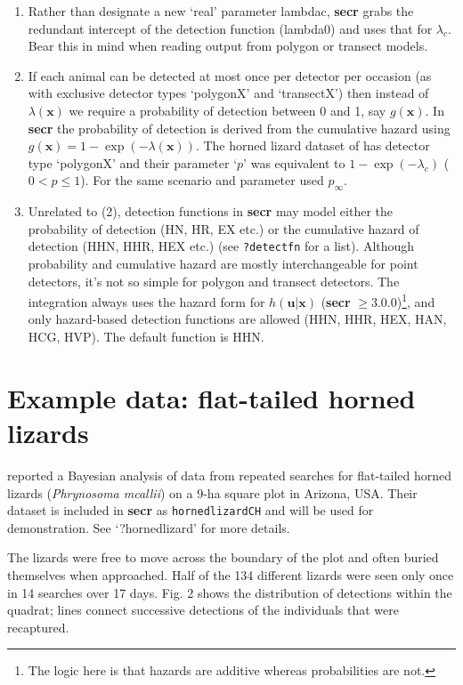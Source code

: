 \documentclass[
]{book}
\begin{document}
\begin{enumerate}
\def\labelenumi{\arabic{enumi}.}
\item
  Rather than designate a new `real' parameter lambdac, \textbf{secr} grabs the redundant intercept of the detection function (lambda0) and uses that for \(\lambda_c\). Bear this in mind when reading output from polygon or transect models.
\item
  If each animal can be detected at most once per detector per occasion (as with exclusive detector types `polygonX' and `transectX') then instead of \(\lambda(\mathbf{x})\) we require a probability of detection between 0 and 1, say \(g(\mathbf{x})\). In \textbf{secr} the probability of detection is derived from the cumulative hazard using \(g(\mathbf{x}) = 1-\exp(-\lambda(\mathbf{x}))\). The horned lizard dataset of \citet{ry08} has detector type `polygonX' and their parameter `\(p\)' was equivalent to \(1 - \exp(-\lambda_c)\) (\(0 < p \le 1\)). For the same scenario and parameter \citet{e11} used \(p_\infty\).
\item
  Unrelated to (2), detection functions in \textbf{secr} may model either the probability of detection (HN, HR, EX etc.) or the cumulative hazard of detection (HHN, HHR, HEX etc.) (see \texttt{?detectfn} for a list). Although probability and cumulative hazard are mostly interchangeable for point detectors, it's not so simple for polygon and transect detectors. The integration always uses the hazard form for \(h(\mathbf{u} | \mathbf{x})\) (\textbf{secr} \(\ge 3.0.0\))\footnote{The logic here is that hazards are additive whereas probabilities are not.}, and only hazard-based detection functions are allowed (HHN, HHR, HEX, HAN, HCG, HVP). The default function is HHN.
\end{enumerate}

\section{Example data: flat-tailed horned lizards}\label{example-data-flat-tailed-horned-lizards}

\citet{ry08} reported a Bayesian analysis of data from repeated searches for flat-tailed horned lizards (\emph{Phrynosoma mcallii}) on a 9-ha square plot in Arizona, USA. Their dataset is included in \textbf{secr} as \texttt{hornedlizardCH} and will be used for demonstration. See `?hornedlizard' for more details.

The lizards were free to move across the boundary of the plot and often buried themselves when approached. Half of the 134 different lizards were seen only once in 14 searches over 17 days. Fig. 2 shows the distribution of detections within the quadrat; lines connect successive detections of the individuals that were recaptured.
\end{document}
